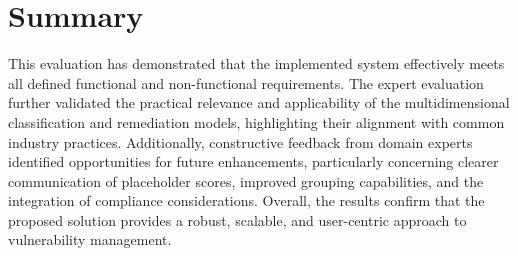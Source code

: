 \section{Summary}

This evaluation has demonstrated that the implemented system effectively meets all defined functional and non-functional requirements. The expert evaluation further validated the practical relevance and applicability of the multidimensional classification and remediation models, highlighting their alignment with common industry practices. Additionally, constructive feedback from domain experts identified opportunities for future enhancements, particularly concerning clearer communication of placeholder scores, improved grouping capabilities, and the integration of compliance considerations. Overall, the results confirm that the proposed solution provides a robust, scalable, and user-centric approach to vulnerability management.